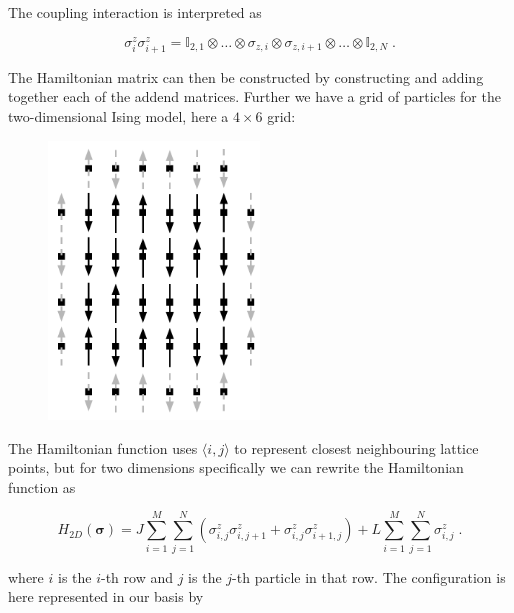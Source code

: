 The coupling interaction is interpreted as

\begin{equation}
  \sigma_i^z \sigma_{i+1}^z = \mathbb{I}_{2, 1} \otimes \dots \otimes \sigma_{z, i} \otimes \sigma_{z, i+1} \otimes \dots \otimes \mathbb{I}_{2, N} \; .
  \label{eq:coupling_spin}
\end{equation}

The Hamiltonian matrix can then be constructed by constructing and adding together each of the addend matrices. Further we have a grid of particles for the two-dimensional Ising model, here a $4\times 6$ grid:

\begin{figure}[H]
  \begin{center}
    \includegraphics[width=0.5\textwidth]{Figures/Drawn/Ising/2dciclous}
  \end{center}
\end{figure}

The Hamiltonian function uses $\langle i, j\rangle$ to represent closest neighbouring lattice points, but for two dimensions specifically we can rewrite the Hamiltonian function as

\begin{equation}
  H_{2D}(\boldsymbol{\sigma}) =J\sum_{i = 1}^M\sum_{j = 1}^N \left (\sigma^z_{i, j}\sigma^z_{i, j + 1} + \sigma_{i, j}^z\sigma^z_{i+1, j} \right )+ L \sum_{i = 1}^M\sum_{j = 1}^N\sigma^z_{i, j} \; .
  \label{eq:2d_ising_ham_func}
\end{equation}

where $i$ is the $i$-th row and $j$ is the $j$-th particle in that row. The configuration is here represented in our basis by 

